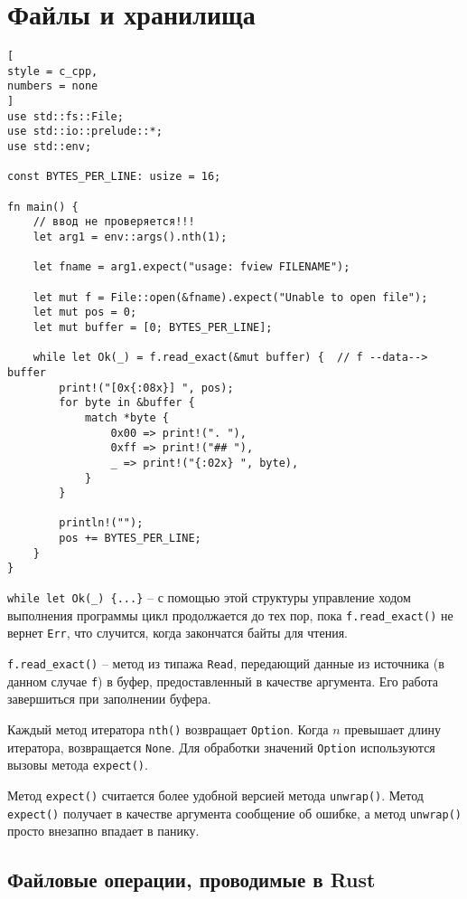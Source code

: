 \documentclass[%
	11pt,
	a4paper,
	utf8,
		]{article}
\begin{document}
\section{Файлы и хранилища}

\begin{lstlisting}[
style = c_cpp,
numbers = none
]
use std::fs::File;
use std::io::prelude::*;
use std::env;

const BYTES_PER_LINE: usize = 16;

fn main() {
	// ввод не проверяется!!!
    let arg1 = env::args().nth(1);
    
    let fname = arg1.expect("usage: fview FILENAME");
    
    let mut f = File::open(&fname).expect("Unable to open file");
    let mut pos = 0;
    let mut buffer = [0; BYTES_PER_LINE];
    
    while let Ok(_) = f.read_exact(&mut buffer) {  // f --data--> buffer
        print!("[0x{:08x}] ", pos);
        for byte in &buffer {
            match *byte {
                0x00 => print!(". "),
                0xff => print!("## "),
                _ => print!("{:02x} ", byte),
            }
        }
    
        println!("");
        pos += BYTES_PER_LINE;
    }
}
\end{lstlisting}

\verb|while let Ok(_) {...}| -- с помощью этой структуры управление ходом выполнения программы цикл продолжается до тех пор, пока \verb|f.read_exact()| не вернет \verb|Err|, что случится, когда закончатся байты для чтения.

\verb|f.read_exact()| -- метод из типажа \verb|Read|, передающий данные из источника (в данном случае \verb|f|) в буфер, предоставленный в качестве аргумента. Его работа завершиться при заполнении буфера.

Каждый метод итератора \verb|nth()| возвращает \verb|Option|. Когда $ n $ превышает длину итератора, возвращается \verb|None|. Для обработки значений \verb|Option| используются вызовы метода \verb|expect()|.

Метод \verb|expect()| считается более удобной версией метода \verb|unwrap()|. Метод \verb|expect()| получает в качестве аргумента сообщение об ошибке, а метод \verb|unwrap()| просто внезапно впадает в панику.

\subsection{Файловые операции, проводимые в Rust}
\end{document}
